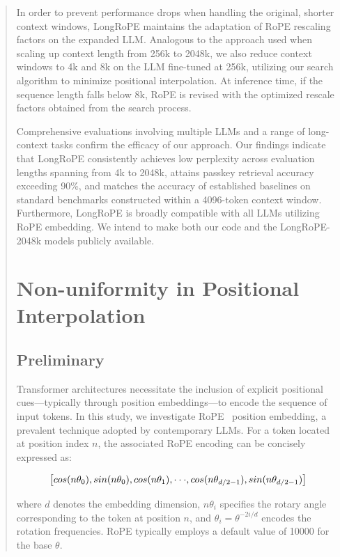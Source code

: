 \begin{abstract}
In order to prevent performance drops when handling the original, shorter context windows, {LongRoPE} maintains the adaptation of RoPE rescaling factors on the expanded LLM. Analogous to the approach used when scaling up context length from 256k to 2048k, we also reduce context windows to 4k and 8k on the LLM fine-tuned at 256k, utilizing our search algorithm to minimize positional interpolation. At inference time, if the sequence length falls below 8k, RoPE is revised with the optimized rescale factors obtained from the search process.

Comprehensive evaluations involving multiple LLMs and a range of long-context tasks confirm the efficacy of our approach. Our findings indicate that LongRoPE consistently achieves low perplexity across evaluation lengths spanning from 4k to 2048k, attains passkey retrieval accuracy exceeding 90\%, and matches the accuracy of established baselines on standard benchmarks constructed within a 4096-token context window. Furthermore, LongRoPE is broadly compatible with all LLMs utilizing RoPE embedding. We intend to make both our code and the LongRoPE-2048k models publicly available.

\section{Non-uniformity in Positional Interpolation}
\label{sec:analysis}

\subsection{Preliminary}

Transformer architectures necessitate the inclusion of explicit positional cues—typically through position embeddings—to encode the sequence of input tokens. In this study, we investigate RoPE~\cite{rope} position embedding, a prevalent technique adopted by contemporary LLMs. For a token located at position index $n$, the associated RoPE encoding can be concisely expressed as:

\begin{equation}
		\fontsize{7.8}{7.8} \selectfont
	\label{eq:rope}
	\left[ cos(n\theta_0), sin(n\theta_0), cos(n\theta_1), \cdot\cdot\cdot, cos(n\theta_{d/2-1}), sin(n\theta_{d/2-1}) \right]   
\end{equation}

where $d$ denotes the embedding dimension,
$n\theta_i$ specifies the rotary angle corresponding to the token at position $n$, and
$\theta_i = \theta^{-2i/d}$ encodes the rotation frequencies. RoPE typically employs a default value of 10000 for the base $\theta$.


\end{abstract}
